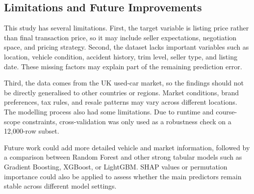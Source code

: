 \subsection{Limitations and Future Improvements}

This study has several limitations.
First, the target variable is listing price rather than final transaction price, so it may include seller expectations, negotiation space, and pricing strategy.
Second, the dataset lacks important variables such as location, vehicle condition, accident history, trim level, seller type, and listing date.
These missing factors may explain part of the remaining prediction error.

Third, the data comes from the UK used-car market, so the findings should not be directly generalised to other countries or regions.
Market conditions, brand preferences, tax rules, and resale patterns may vary across different locations.
The modelling process also had some limitations.
Due to runtime and course-scope constraints, cross-validation was only used as a robustness check on a 12{,}000-row subset.

Future work could add more detailed vehicle and market information, followed by a comparison between Random Forest and other strong tabular models such as Gradient Boosting, XGBoost, or LightGBM.
SHAP values or permutation importance could also be applied to assess whether the main predictors remain stable across different model settings.
